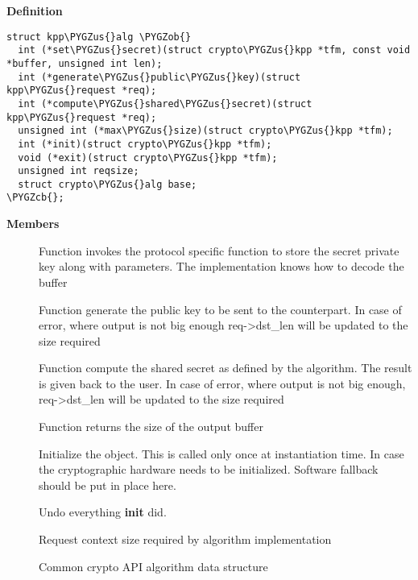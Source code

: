 \documentclass[a4paper,8pt,english]{sphinxmanual}
\def\PYGZus{\char`\_}
\def\PYGZob{\char`\{}
\def\PYGZcb{\char`\}}
\begin{document}
\textbf{Definition}

\begin{Verbatim}[commandchars=\\\{\}]
struct kpp\PYGZus{}alg \PYGZob{}
  int (*set\PYGZus{}secret)(struct crypto\PYGZus{}kpp *tfm, const void *buffer, unsigned int len);
  int (*generate\PYGZus{}public\PYGZus{}key)(struct kpp\PYGZus{}request *req);
  int (*compute\PYGZus{}shared\PYGZus{}secret)(struct kpp\PYGZus{}request *req);
  unsigned int (*max\PYGZus{}size)(struct crypto\PYGZus{}kpp *tfm);
  int (*init)(struct crypto\PYGZus{}kpp *tfm);
  void (*exit)(struct crypto\PYGZus{}kpp *tfm);
  unsigned int reqsize;
  struct crypto\PYGZus{}alg base;
\PYGZcb{};
\end{Verbatim}

\textbf{Members}
\begin{description}
\item[{}] \leavevmode
Function invokes the protocol specific function to
store the secret private key along with parameters.
The implementation knows how to decode the buffer

\item[{}] \leavevmode
Function generate the public key to be sent to the
counterpart. In case of error, where output is not big
enough req-\textgreater{}dst\_len will be updated to the size
required

\item[{}] \leavevmode
Function compute the shared secret as defined by
the algorithm. The result is given back to the user.
In case of error, where output is not big enough,
req-\textgreater{}dst\_len will be updated to the size required

\item[{}] \leavevmode
Function returns the size of the output buffer

\item[{}] \leavevmode
Initialize the object. This is called only once at
instantiation time. In case the cryptographic hardware
needs to be initialized. Software fallback should be
put in place here.

\item[{}] \leavevmode
Undo everything \textbf{init} did.

\item[{}] \leavevmode
Request context size required by algorithm
implementation

\item[{}] \leavevmode
Common crypto API algorithm data structure

\end{description}
\end{document}
